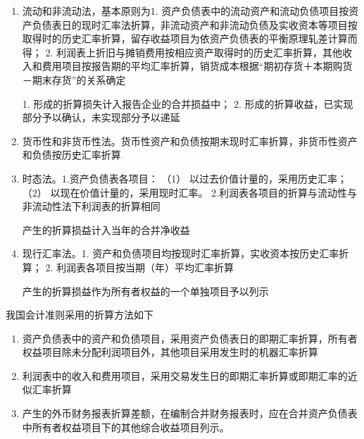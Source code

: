 \documentclass[UTF8,12pt]{ctexart}
\numberwithin{equation}{section} %
\numberwithin{figure}{section}
\numberwithin{table}{section}
\begin{document}
	\begin{enumerate}
		\item 流动和非流动法，基本原则为1.	资产负债表中的流动资产和流动负债项目按资产负债表日的现时汇率法折算，非流动资产和非流动负债及实收资本等项目按取得时的历史汇率折算，留存收益项目为依资产负债表的平衡原理轧差计算而得；
		2.	利润表上折旧与摊销费用按相应资产取得时的历史汇率折算，其他收入和费用项目按报告期的平均汇率折算，销货成本根据“期初存货＋本期购货－期末存货”的关系确定
		
		1.	形成的折算损失计入报告企业的合并损益中；
		2.	形成的折算收益，已实现部分予以确认，未实现部分予以递延
		
		\item 货币性和非货币性法。货币性资产和负债按期末现时汇率折算，非货币性资产和负债按历史汇率折算
		
		\item 时态法。1.资产负债表各项目：
		（1）	以过去价值计量的，采用历史汇率；
		（2）	以现在价值计量的，采用现时汇率。
		2.利润表各项目的折算与流动性与非流动性法下利润表的折算相同
		
		产生的折算损益计入当年的合并净收益
		
		
		\item 现行汇率法。1.	资产和负债项目均按现时汇率折算，实收资本按历史汇率折算；
		2.	利润表各项目按当期（年）平均汇率折算
		
		产生的折算损益作为所有者权益的一个单独项目予以列示
	\end{enumerate}
	
	我国会计准则采用的折算方法如下
	\begin{enumerate}
		\item 资产负债表中的资产和负债项目，采用资产负债表日的即期汇率折算，所有者权益项目除未分配利润项目外，其他项目采用发生时的机器汇率折算
		
		\item 利润表中的收入和费用项目，采用交易发生日的即期汇率折算或即期汇率的近似汇率折算
		
		\item 产生的外币财务报表折算差额，在编制合并财务报表时，应在合并资产负债表中所有者权益项目下的其他综合收益项目列示。
		
	\end{enumerate}
	
\end{document}
